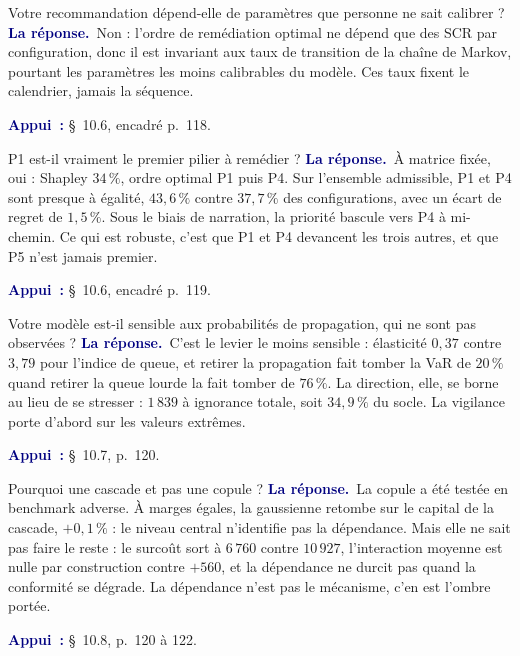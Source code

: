 \documentclass[11pt,a4paper]{article}
\newcommand{\rep}[1]{\smallskip\noindent\textcolor{navy}{\textbf{La réponse.}}\ #1\par}
\newcommand{\appui}[1]{\smallskip\noindent\small\textcolor{navy}{\textbf{Appui~:}} #1\par\normalsize}
\begin{document}
\begin{question}{\og Votre recommandation dépend-elle de paramètres que personne ne sait calibrer ?\fg{}}
\rep{Non : l'ordre de remédiation optimal ne dépend que des SCR par configuration, donc il est
invariant aux taux de transition de la chaîne de Markov, pourtant les paramètres les moins
calibrables du modèle. Ces taux fixent le calendrier, jamais la séquence.}
\appui{\S~10.6, encadré p.~118.}
\end{question}

\begin{question}{\og P1 est-il vraiment le premier pilier à remédier ?\fg{}}
\rep{À matrice fixée, oui : Shapley $34\,\%$, ordre optimal P1 puis P4. Sur l'ensemble admissible,
P1 et P4 sont presque à égalité, $43{,}6\,\%$ contre $37{,}7\,\%$ des configurations, avec un
écart de regret de $1{,}5\,\%$. Sous le biais de narration, la priorité bascule vers P4 à mi-chemin.
Ce qui est robuste, c'est que P1 et P4 devancent les trois autres, et que P5 n'est jamais premier.}
\appui{\S~10.6, encadré p.~119.}
\end{question}

\begin{question}{\og Votre modèle est-il sensible aux probabilités de propagation, qui ne sont pas observées ?\fg{}}
\rep{C'est le levier le moins sensible : élasticité $0{,}37$ contre $3{,}79$ pour l'indice de
queue, et retirer la propagation fait tomber la VaR de $20\,\%$ quand retirer la queue lourde la
fait tomber de $76\,\%$. La direction, elle, se borne au lieu de se stresser : $1\,839$ à ignorance
totale, soit $34{,}9\,\%$ du socle. La vigilance porte d'abord sur les valeurs extrêmes.}
\appui{\S~10.7, p.~120.}
\end{question}

\begin{question}{\og Pourquoi une cascade et pas une copule ?\fg{}}
\rep{La copule a été testée en benchmark adverse. À marges égales, la gaussienne retombe sur le
capital de la cascade, $+0{,}1\,\%$ : le niveau central n'identifie pas la dépendance. Mais elle ne
sait pas faire le reste : le surcoût sort à $6\,760$ contre $10\,927$, l'interaction moyenne est
nulle par construction contre $+560$, et la dépendance ne durcit pas quand la conformité se
dégrade. La dépendance n'est pas le mécanisme, c'en est l'ombre portée.}
\appui{\S~10.8, p.~120 à 122.}
\end{question}
\end{document}
